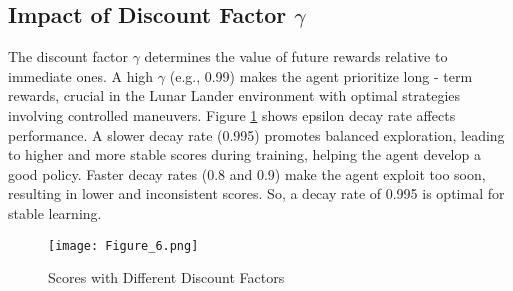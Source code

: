 \documentclass[conference]{IEEEtran}
\begin{document}
\subsection{Impact of Discount Factor $\gamma$}
The discount factor $\gamma$ determines the value of future rewards relative to immediate ones. A high $\gamma$ (e.g., 0.99) makes the agent prioritize long - term rewards, crucial in the Lunar Lander environment with optimal strategies involving controlled maneuvers. Figure \ref{fig:gamma_scores} shows epsilon decay rate affects performance. A slower decay rate (0.995) promotes balanced exploration, leading to higher and more stable scores during training, helping the agent develop a good policy. Faster decay rates (0.8 and 0.9) make the agent exploit too soon, resulting in lower and inconsistent scores. So, a decay rate of 0.995 is optimal for stable learning.

\begin{figure}[!ht]
    \centering
    \texttt{[image: Figure\_6.png]}
    \caption{Scores with Different Discount Factors}
    \label{fig:gamma_scores}
\end{figure}
\end{document}
